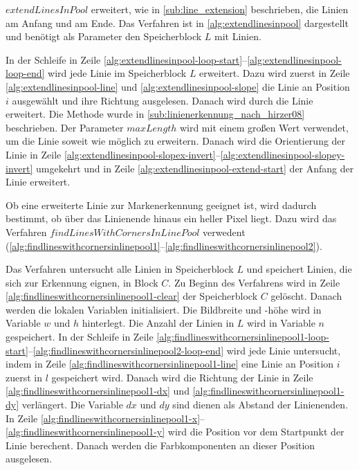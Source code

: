 $\mathit{extendLinesInPool}$ erweitert, wie in \autoref{sub:line_extension} beschrieben, die Linien am Anfang und am
 Ende. Das Verfahren ist in \autoref{alg:extendlinesinpool} dargestellt und benötigt als Parameter den Speicherblock
 $L$ mit Linien.



In der Schleife in Zeile \ref{alg:extendlinesinpool-loop-start}--\ref{alg:extendlinesinpool-loop-end} wird jede Linie im
 Speicherblock $L$ erweitert. Dazu wird zuerst in Zeile \ref{alg:extendlinesinpool-line} und
 \ref{alg:extendlinesinpool-slope} die Linie an Position $i$ ausgewählt und ihre Richtung ausgelesen. Danach wird durch
  die Linie erweitert. Die Methode  wurde in
 \autoref{sub:linienerkennung_nach_hirzer08} beschrieben. Der Parameter $\mathit{maxLength}$ wird mit einem großen Wert
 verwendet, um die Linie soweit wie möglich zu erweitern. Danach wird die Orientierung der Linie in Zeile
 \ref{alg:extendlinesinpool-slopex-invert}--\ref{alg:extendlinesinpool-slopey-invert} umgekehrt und in Zeile
 \ref{alg:extendlinesinpool-extend-start} der Anfang der Linie erweitert.

Ob eine erweiterte Linie zur Markenerkennung geeignet ist, wird dadurch bestimmt, ob über das Linienende hinaus ein
 heller Pixel liegt. Dazu wird das Verfahren $\mathit{findLinesWithCornersInLinePool}$ verwedent
 (\autoref{alg:findlineswithcornersinlinepool1}--\autoref{alg:findlineswithcornersinlinepool2}).




Das Verfahren untersucht alle Linien in Speicherblock $L$ und speichert Linien, die sich zur Erkennung eignen, in Block
 $C$. Zu Beginn des Verfahrens wird in Zeile \ref{alg:findlineswithcornersinlinepool1-clear} der Speicherblock $C$
 gelöscht. Danach werden die lokalen Variablen initialisiert. Die Bildbreite und -höhe wird in Variable $w$ und $h$
 hinterlegt. Die Anzahl der Linien in $L$ wird in Variable $n$ gespeichert. In der Schleife in Zeile
 \ref{alg:findlineswithcornersinlinepool1-loop-start}--\ref{alg:findlineswithcornersinlinepool2-loop-end} wird jede
 Linie untersucht, indem in Zeile \ref{alg:findlineswithcornersinlinepool1-line} eine Linie an Position $i$ zuerst in
 $l$ gespeichert wird. Danach wird die Richtung der Linie in Zeile \ref{alg:findlineswithcornersinlinepool1-dx} und
 \ref{alg:findlineswithcornersinlinepool1-dy} verlängert. Die Variable $dx$ und $dy$ sind dienen als Abstand der
 Linienenden. In Zeile \ref{alg:findlineswithcornersinlinepool1-x}--\ref{alg:findlineswithcornersinlinepool1-y} wird
 die Position vor dem Startpunkt der Linie berechent. Danach werden die Farbkomponenten an dieser Position ausgelesen.

